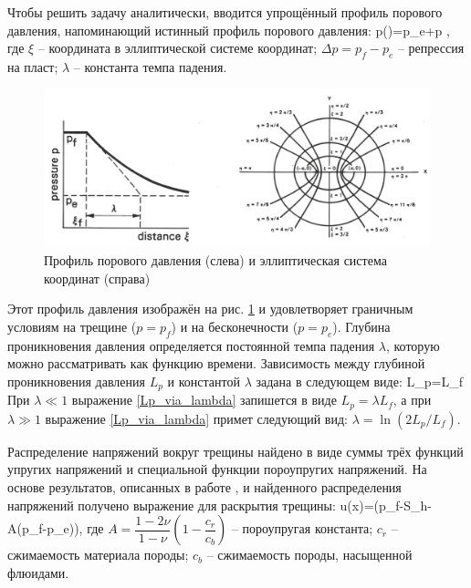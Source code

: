 Чтобы решить задачу аналитически, вводится упрощённый профиль порового давления, напоминающий истинный профиль порового давления:
\beq
p(\xi)=p_e+\Delta p ,
\eeq
где $\xi$ -- координата в эллиптической системе координат;
$\Delta p=p_f-p_e$ -- репрессия на пласт;
$\lambda$ -- константа темпа падения.

\begin{figure}[H] 
\center
\includegraphics[width=\linewidth]{images/Hagoort_pressure_distribution.jpg}
\caption{Профиль порового давления (слева) и эллиптическая система координат (справа) \cite{hagoort_phd}} 
\label{fig:hagoort_pressure_distribution}  
\end{figure}

Этот профиль давления изображён на рис. \ref{fig:hagoort_pressure_distribution} и удовлетворяет граничным условиям на трещине ($p=p_f$) и на бесконечности ($p=p_e$).
Глубина проникновения давления определяется постоянной темпа падения $\lambda$, которую можно рассматривать как функцию времени.
Зависимость между глубиной проникновения давления $L_p$ и константой $\lambda$ задана в следующем виде:
\beq\label{Lp_via_lambda}
L_p=L_{\!f}\sinh{\lambda}
\eeq
При $\lambda\ll 1$ выражение \eqref{Lp_via_lambda} запишется в виде $L_p=\lambda L_f$, а при $\lambda\gg 1$ выражение \eqref{Lp_via_lambda} примет следующий вид: $\lambda=\ln{\left(2L_p/L_{\!f}\right)}$.

Распределение напряжений вокруг трещины найдено в виде суммы трёх функций упругих напряжений и специальной функции пороупругих напряжений.
На основе результатов, описанных в работе \cite{timoshenko_goodier}, и найденного распределения напряжений получено выражение для раскрытия трещины:
\beq\label{HaggoortFractureOpening}
u(x)=\left(p_{\!f}-S_h-A\left(p_{\!f}-p_e\right)\right),
\eeq
где
$A=\dfrac{1-2\nu}{1-\nu}\left(1-\dfrac{c_r}{c_b}\right)$ -- пороупругая константа;
$c_r$ -- сжимаемость материала породы;
$c_b$ -- сжимаемость породы, насыщенной флюидами.

